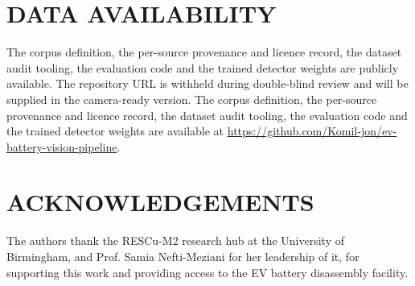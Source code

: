 \section*{\uppercase{Data Availability}}
\ifanon
\noindent The corpus definition, the per-source provenance and licence record, the
dataset audit tooling, the evaluation code and the trained detector weights are
publicly available. The repository URL is withheld during double-blind review and will
be supplied in the camera-ready version.
\else
\noindent The corpus definition, the per-source provenance and licence record, the
dataset audit tooling, the evaluation code and the trained detector weights are
available at \url{https://github.com/Komil-jon/ev-battery-vision-pipeline}.
\fi

\ifanon\else
\section*{\uppercase{Acknowledgements}}
\noindent The authors thank the RESCu-M2 research hub at the University of Birmingham,
and Prof. Samia Nefti-Meziani for her leadership of it, for supporting this work and
providing access to the EV battery disassembly facility.
\fi


{\small
}


